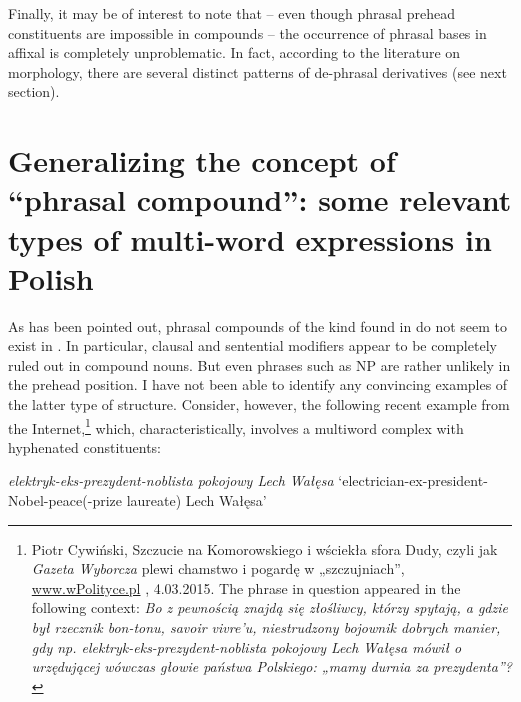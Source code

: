 \documentclass[output=paper]{LSP/langsci}
\begin{document}
Finally, it may be of interest to note that – even though phrasal prehead constituents are impossible in  compounds – the occurrence of phrasal bases in affixal  is completely unproblematic. In fact, according to the literature on  morphology, there are several distinct patterns of de-phrasal derivatives (see next section).

\section{Generalizing the concept of “phrasal compound”: some relevant types of multi-word expressions in Polish}\label{sec:szymanek:4}

{As has been pointed out, phrasal compounds of the kind found in  do not seem to exist in . In particular, clausal and sentential modifiers appear to be completely ruled out in  compound nouns. But even phrases such as NP are rather unlikely in the prehead position. I have not been able to identify any convincing examples of the latter type of structure. Consider, however, the following recent example from the Internet,}\footnote{{Piotr Cywiński,} {Szczucie na Komorowskiego i wściekła sfora Dudy, czyli jak} {\textit{Gazeta Wyborcza}} {plewi chamstwo i pogardę w „szczujniach”,} \href{http://www.wPolityce.pl/}{{{www.wPolityce.pl}}} {, 4.03.2015. The phrase in question appeared in the following context:} {\textit{Bo z pewnością znajdą się złośliwcy, którzy spytają, a gdzie był rzecznik bon-tonu, savoir vivre’u, niestrudzony bojownik dobrych manier, gdy np. elektryk-eks-prezydent-noblista pokojowy Lech Wałęsa mówił o urzędującej wówczas głowie państwa Polskiego: „mamy durnia za prezydenta”?}} } {which, characteristically, involves a multiword complex  with hyphenated constituents:}

\ea\label{ex:szymanek:14a}{\textit{elektryk-eks-prezydent-noblista pokojowy Lech Wałęsa}}
 {‘electrician-ex-president-Nobel-peace(-prize laureate) Lech Wałęsa’}
\z 
\end{document}
